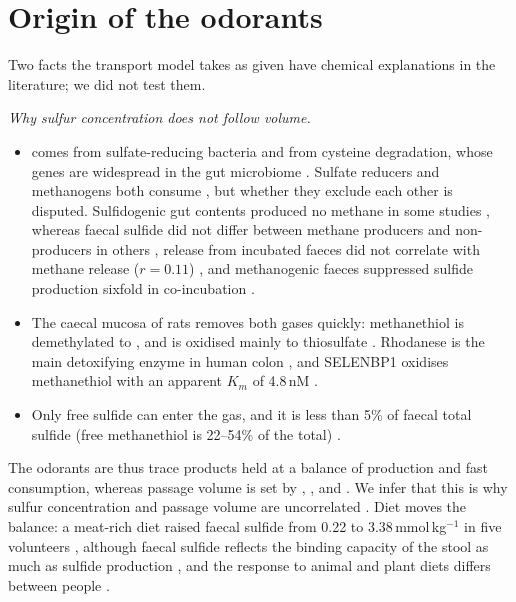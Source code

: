 \documentclass[11pt]{article}
\begin{document}
\section{Origin of the odorants}
\label{sec:si-origin}
Two facts the transport model takes as given have chemical explanations in the literature; we did not test them.

\emph{Why sulfur concentration does not follow volume.}
\begin{itemize}
  \item {} comes from sulfate-reducing bacteria \cite{gibson1993} and from cysteine degradation, whose genes are
  widespread in the gut microbiome \cite{braccia2021}. Sulfate reducers and methanogens both consume , but
  whether they exclude each other is disputed. Sulfidogenic gut contents produced no methane in some studies
  \cite{gibson1993,gibson1993b}, whereas faecal sulfide did not differ between methane producers and non-producers in
  others \cite{strocchi1991,florin1991},  release from incubated faeces did not correlate with methane release
  ($r = 0.11$) \cite{levine1998}, and methanogenic faeces suppressed sulfide production sixfold in co-incubation
  \cite{strocchi1994}.
  \item The caecal mucosa of rats removes both gases quickly: methanethiol is demethylated to , and  is
  oxidised mainly to thiosulfate \cite{levitt1999}. Rhodanese is the main detoxifying enzyme in human colon
  \cite{picton2002}, and SELENBP1 oxidises methanethiol with an apparent $K_m$ of 4.8\,nM \cite{pol2018}.
  \item Only free sulfide can enter the gas, and it is less than 5\% of faecal total sulfide (free methanethiol is
  22--54\% of the total) \cite{tangerman2009}.
\end{itemize}
The odorants are thus trace products held at a balance of production and fast consumption, whereas passage volume is
set by , ,  and . We infer that this is why sulfur concentration and passage volume are
uncorrelated \cite{suarez1997}. Diet moves the balance: a meat-rich diet raised faecal sulfide from 0.22 to
3.38\,mmol\,kg$^{-1}$ in five volunteers \cite{magee2000}, although faecal sulfide reflects the binding capacity of the
stool as much as sulfide production \cite{levitt2002}, and the response to animal and plant diets differs between
people \cite{teigen2022}.
\end{document}
